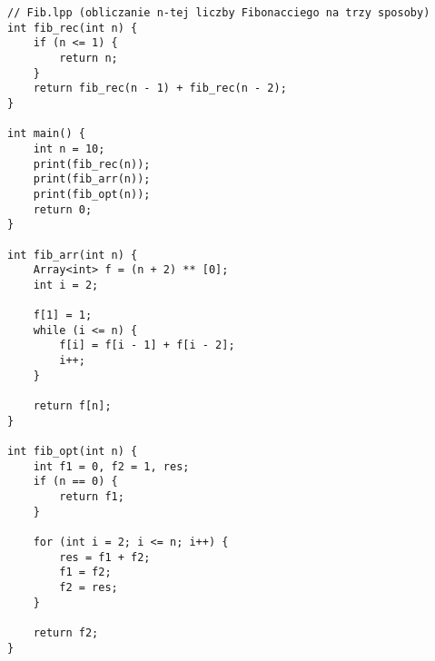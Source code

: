 \documentclass[a4paper]{article}
\begin{document}
\begin{lstlisting}
// Fib.lpp (obliczanie n-tej liczby Fibonacciego na trzy sposoby)
int fib_rec(int n) {
    if (n <= 1) {
        return n;
    }
    return fib_rec(n - 1) + fib_rec(n - 2);
}

int main() {
    int n = 10;
    print(fib_rec(n));
    print(fib_arr(n));
    print(fib_opt(n));
    return 0;
}

int fib_arr(int n) {
    Array<int> f = (n + 2) ** [0];
    int i = 2;

    f[1] = 1;
    while (i <= n) {
        f[i] = f[i - 1] + f[i - 2];
        i++;
    }

    return f[n];
}

int fib_opt(int n) {
    int f1 = 0, f2 = 1, res;
    if (n == 0) {
        return f1;
    }

    for (int i = 2; i <= n; i++) {
        res = f1 + f2;
        f1 = f2;
        f2 = res;
    }

    return f2;
}
\end{lstlisting}

\newpage
\end{document}
